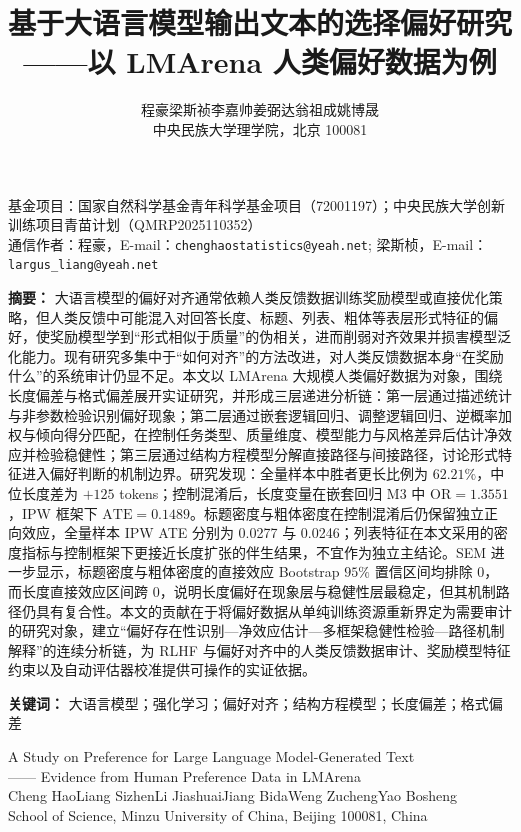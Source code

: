 \documentclass[9pt,a4paper,fontset=windows]{ctexart}
\title{\heiti 基于大语言模型输出文本的选择偏好研究\\
\large ——以 LMArena 人类偏好数据为例}
\author{程豪\quad 梁斯祯\quad 李嘉帅\quad 姜弼达\quad 翁祖成\quad 姚博晟\\
\small 中央民族大学理学院，北京 100081}
\date{}
\theoremstyle{definition}
\numberwithin{equation}{section}
\begin{document}
\maketitle
\thispagestyle{empty}

\begin{center}\small
基金项目：国家自然科学基金青年科学基金项目（72001197）；中央民族大学创新训练项目青苗计划（QMRP2025110352）\\
通信作者：程豪，E-mail：\texttt{chenghaostatistics@yeah.net}; 梁斯桢，E-mail：\texttt{largus\_liang@yeah.net}
\end{center}

\noindent\textbf{摘\quad 要：}
大语言模型的偏好对齐通常依赖人类反馈数据训练奖励模型或直接优化策略，但人类反馈中可能混入对回答长度、标题、列表、粗体等表层形式特征的偏好，使奖励模型学到“形式相似于质量”的伪相关，进而削弱对齐效果并损害模型泛化能力。现有研究多集中于“如何对齐”的方法改进，对人类反馈数据本身“在奖励什么”的系统审计仍显不足。本文以 LMArena 大规模人类偏好数据为对象，围绕长度偏差与格式偏差展开实证研究，并形成三层递进分析链：第一层通过描述统计与非参数检验识别偏好现象；第二层通过嵌套逻辑回归、调整逻辑回归、逆概率加权与倾向得分匹配，在控制任务类型、质量维度、模型能力与风格差异后估计净效应并检验稳健性；第三层通过结构方程模型分解直接路径与间接路径，讨论形式特征进入偏好判断的机制边界。研究发现：全量样本中胜者更长比例为 \(62.21\%\)，中位长度差为 \(+125\) tokens；控制混淆后，长度变量在嵌套回归 M3 中 \(\mathrm{OR}=1.3551\)，IPW 框架下 \(\mathrm{ATE}=0.1489\)。标题密度与粗体密度在控制混淆后仍保留独立正向效应，全量样本 IPW ATE 分别为 0.0277 与 0.0246；列表特征在本文采用的密度指标与控制框架下更接近长度扩张的伴生结果，不宜作为独立主结论。SEM 进一步显示，标题密度与粗体密度的直接效应 Bootstrap \(95\%\) 置信区间均排除 0，而长度直接效应区间跨 0，说明长度偏好在现象层与稳健性层最稳定，但其机制路径仍具有复合性。本文的贡献在于将偏好数据从单纯训练资源重新界定为需要审计的研究对象，建立“偏好存在性识别—净效应估计—多框架稳健性检验—路径机制解释”的连续分析链，为 RLHF 与偏好对齐中的人类反馈数据审计、奖励模型特征约束以及自动评估器校准提供可操作的实证依据。

\noindent\textbf{关键词：} 大语言模型；强化学习；偏好对齐；结构方程模型；长度偏差；格式偏差

\vspace{1em}

\begin{center}
{\heiti\large A Study on Preference for Large Language Model-Generated Text}\\[0.3em]
{\large —— Evidence from Human Preference Data in LMArena}\\[0.8em]
Cheng Hao\quad Liang Sizhen\quad Li Jiashuai\quad Jiang Bida\quad Weng Zucheng\quad Yao Bosheng\\
\small School of Science, Minzu University of China, Beijing 100081, China
\end{center}
\end{document}
